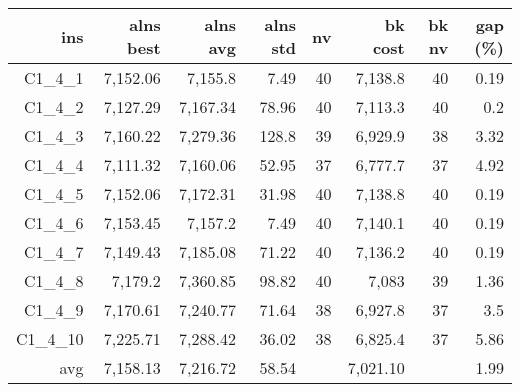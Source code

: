  \begin{table}[caption={Kết quả đo với tập HG\_C\_1\_4 400 yêu cầu}, label=exp:HGC14]
    \small
    \centering
    \begin{tabular}{rrrrrrrr}
    \hline
    ins & alns best & alns avg & alns std & nv & bk cost & bk nv & gap (\%) \\ \hline
    C1\_4\_1 & 7,152.06 & 7,155.8 & 7.49 & 40 & 7,138.8 & 40 & 0.19 \\ \hline
    C1\_4\_2 & 7,127.29 & 7,167.34 & 78.96 & 40 & 7,113.3 & 40 & 0.2 \\ \hline
    C1\_4\_3 & 7,160.22 & 7,279.36 & 128.8 & 39 & 6,929.9 & 38 & 3.32 \\ \hline
    C1\_4\_4 & 7,111.32 & 7,160.06 & 52.95 & 37 & 6,777.7 & 37 & 4.92 \\ \hline
    C1\_4\_5 & 7,152.06 & 7,172.31 & 31.98 & 40 & 7,138.8 & 40 & 0.19 \\ \hline
    C1\_4\_6 & 7,153.45 & 7,157.2 & 7.49 & 40 & 7,140.1 & 40 & 0.19 \\ \hline
    C1\_4\_7 & 7,149.43 & 7,185.08 & 71.22 & 40 & 7,136.2 & 40 & 0.19 \\ \hline
    C1\_4\_8 & 7,179.2 & 7,360.85 & 98.82 & 40 & 7,083 & 39 & 1.36 \\ \hline
    C1\_4\_9 & 7,170.61 & 7,240.77 & 71.64 & 38 & 6,927.8 & 37 & 3.5 \\ \hline
    C1\_4\_10 & 7,225.71 & 7,288.42 & 36.02 & 38 & 6,825.4 & 37 & 5.86 \\ \hline
    avg & 7,158.13 & 7,216.72 & 58.54 & & 7,021.10 & & 1.99 \\ \hline
    \end{tabular}
  \end{table}

